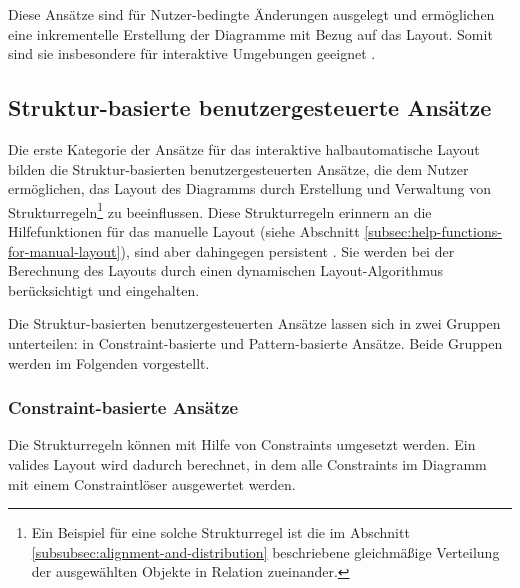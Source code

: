 Diese Ansätze sind für Nutzer-bedingte Änderungen ausgelegt und ermöglichen eine inkrementelle Erstellung der Diagramme mit Bezug auf das Layout. Somit sind sie insbesondere für interaktive Umgebungen geeignet \cite{Arvo02Techniques, GladischSchumann14Semi-Automatic, Wybrow08Using}.



\subsection{Struktur-basierte benutzergesteuerte Ansätze}
\label{structure-based-user-controlled-approaches}

Die erste Kategorie der Ansätze für das interaktive halbautomatische Layout bilden die Struktur-basierten benutzergesteuerten Ansätze, die dem Nutzer ermöglichen, das Layout des Diagramms durch Erstellung und Verwaltung von Strukturregeln\footnote{Ein Beispiel für eine solche Strukturregel ist die im Abschnitt \ref{subsubsec:alignment-and-distribution} beschriebene gleichmäßige Verteilung der ausgewählten Objekte in Relation zueinander.} zu beeinflussen. Diese Strukturregeln erinnern an die Hilfefunktionen für das manuelle Layout (siehe Abschnitt \ref{subsec:help-functions-for-manual-layout}), sind aber dahingegen persistent \cite{Wybrow08Using}. Sie werden bei der Berechnung des Layouts durch einen dynamischen Layout-Algorithmus berücksichtigt und eingehalten.

Die Struktur-basierten benutzergesteuerten Ansätze lassen sich in zwei Gruppen unterteilen: in Constraint-basierte und Pattern-basierte Ansätze. Beide Gruppen werden im Folgenden vorgestellt.

\subsubsection{Constraint-basierte Ansätze}
\label{subsubsec:constraint-based-approaches}

Die Strukturregeln können mit Hilfe von Constraints umgesetzt werden. Ein valides Layout wird dadurch berechnet, in dem alle Constraints im Diagramm mit einem Constraintlöser ausgewertet werden.





